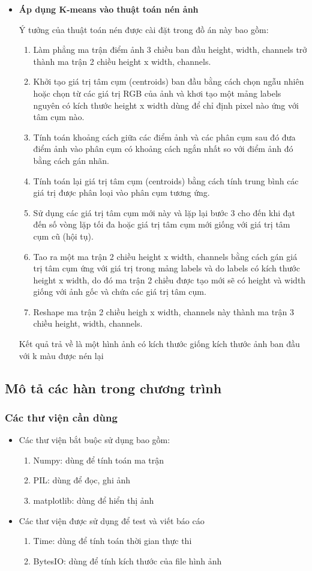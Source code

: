 \begin{itemize}
	\item \textbf{Áp dụng K-means vào thuật toán nén ảnh}\par
	Ý tưởng của thuật toán nén được cài đặt trong đồ án này bao gồm:
	\begin{enumerate}
		\item Làm phẳng ma trận điểm ảnh 3 chiều ban đầu height, width, channels trở thành ma trận 2 chiều height x width, channels.
		\item Khởi tạo giá trị tâm cụm (centroids) ban đầu bằng cách chọn ngẫu nhiên hoặc chọn từ các giá trị RGB của ảnh và khơi tạo một mảng labels nguyên có kích thước height x width dùng để chỉ định pixel nào ứng với tâm cụm nào.
		\item Tính toán khoảng cách giữa các điểm ảnh và các phân cụm sau đó đưa điểm ảnh vào phân cụm có khoảng cách ngắn nhất so với điểm ảnh đó bằng cách gán nhãn.
		\item Tính toán lại giá trị tâm cụm (centroids) bằng cách tính trung bình các giá trị được phân loại vào phân cụm tương ứng.
		\item Sử dụng các giá trị tâm cụm mới này và lặp lại bước 3 cho đến khi đạt đến số vòng lặp tối đa hoặc giá trị tâm cụm mới giống với giá trị tâm cụm cũ (hội tụ).
		\item Tao ra một ma trận 2 chiều height x width, channels bằng cách gán giá trị tâm cụm ứng với giá trị trong mảng labels và do labels có kích thước height x width, do đó ma trận 2 chiều được tạo mới sẽ có height và width giống với ảnh gốc và chứa các giá trị tâm cụm.
		\item Reshape ma trận 2 chiều heigh x width, channels này thành ma trận 3 chiều height, width, channels.
	\end{enumerate}
	Kết quả trả về là một hình ảnh có kích thước giống kích thước ảnh ban đầu với k màu được nén lại
\end{itemize}

\subsection{Mô tả các hàn trong chương trình}
\subsubsection{Các thư viện cần dùng}
\begin{itemize}
	\item Các thư viện bắt buộc sử dụng bao gồm:
	\begin{enumerate}
		\item Numpy: dùng để tính toán ma trận
		\item PIL: dùng để đọc, ghi ảnh
		\item matplotlib: dùng để hiển thị ảnh
	\end{enumerate}
	\item Các thư viện được sử dụng để test và viết báo cáo
	\begin{enumerate}
		\item Time: dùng để tính toán thời gian thực thi
		\item BytesIO: dùng để tính kích thước của file hình ảnh
	\end{enumerate}
\end{itemize}

